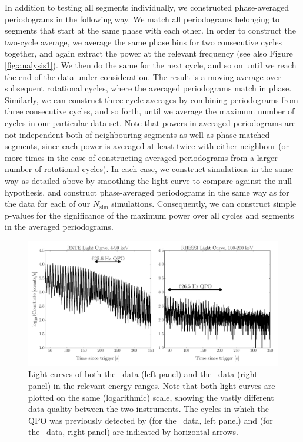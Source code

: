 \documentclass{emulateapj}
\begin{document}
In addition to testing all segments individually, we constructed phase-averaged periodograms in the following way. We match all periodograms belonging to segments that start at the same phase with each other. In order to construct the two-cycle average, we average the same phase bins for two consecutive cycles together, and again extract the power at the relevant frequency (see also Figure \ref{fig:analysis1}). We then do the same for the next cycle, and so on until we reach the end of the data under consideration. The result is a moving average over subsequent rotational cycles, where the averaged periodograms match in phase.
Similarly, we can construct three-cycle averages by combining periodograms from three consecutive cycles, and so forth, until we average the maximum number of cycles in our particular data set.  
Note that powers in averaged periodograms are not independent both of neighbouring segments as well as phase-matched segments, since each power is averaged at least twice with either neighbour (or more times in the case of constructing averaged periodograms from a larger number of rotational cycles). 
In each case, we construct simulations in the same way as detailed above by smoothing the light curve to compare against the null hypothesis, and construct phase-averaged periodograms in the same way as for the data for each of our $N_\mathrm{sim}$ simulations. Consequently, we can construct simple p-values for the significance of the maximum power over all cycles and segments in the averaged periodograms. 

\begin{figure}[htbp]
\begin{center}
\includegraphics[width=18cm]{f4.pdf}
\caption{Light curves of both the \rxte\ data (left panel) and the \rhessi\ data (right panel) in the relevant energy ranges. Note that both light curves are plotted on the same (logarithmic) scale, showing the vastly different data quality between the two instruments. 
The cycles in which the QPO was previously detected by \citet{Strohmayer06} (for the \rxte\ data, left panel) and \citet{Watts06} (for the \rhessi\ data, right panel) are indicated by horizontal arrows.}
\label{fig:lcs}
\end{center}
\end{figure}
\end{document}
